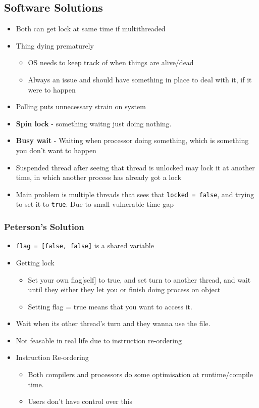 \documentclass{article}
\begin{document}
	\subsection{Software Solutions}
		\begin{itemize}
			\item Both can get lock at same time if multithreaded
			\item Thing dying prematurely
			\begin{itemize}
				\item OS needs to keep track of when things are alive/dead
				\item Always an issue and should have something in place to deal with it, if it were to happen		
			\end{itemize}
			\item Polling	puts unnecessary strain on system
			\item \textbf{Spin lock} - something waitng just doing nothing. 
			\item \textbf{Busy wait} - Waiting when processor doing something, which is something you don't want to happen
			\item Suspended thread after seeing that thread is unlocked may lock it at another time, in which another process has already got a lock \\	
			\item Main problem is multiple threads that sees that \texttt{locked = false}, and trying to set it to \texttt{true}. Due to small vulnerable time gap
		\end{itemize}
		

		\subsubsection{Peterson's Solution}
			\begin{itemize}
				\item \texttt{flag = [false, false]} is a shared variable
				\item Getting lock
				\begin{itemize}
					\item Set your own flag[self] to true, and set turn to another thread, and wait until they either they let you or finish doing process on object
					\item Setting flag = true means that you want to access it. 
				\end{itemize}

				\item Wait when its other thread's turn and they wanna use the file.
				\item Not feasable in real life due to instruction re-ordering

				\item Instruction Re-ordering
				\begin{itemize}
					\item Both compilers and processors do some optimisation at runtime/compile time. 
					\item Users don't have control over this
				\end{itemize}
			\end{itemize}
\end{document}
